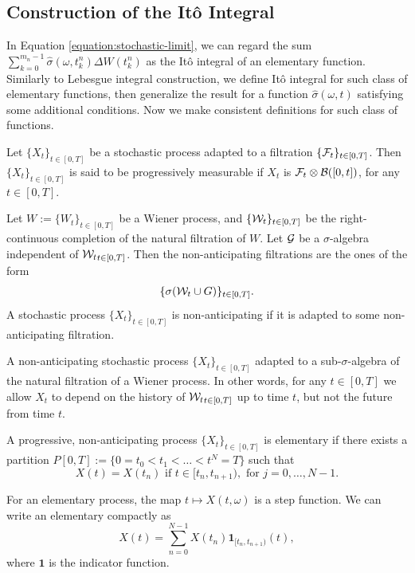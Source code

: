 \subsection{Construction of the Itô Integral}

In Equation \ref{equation:stochastic-limit}, we can regard the sum $\sum\limits_{k=0}^{m_n-1} \hat{\sigma}(\omega, t_k^n)\Delta W(t^n_{k})$ as the Itô integral of an elementary function. Similarly to Lebesgue integral construction, we define Itô integral for such class of elementary functions, then generalize the result for a function $\hat{\sigma}(\omega, t)$ satisfying some additional conditions. Now we make consistent definitions for such class of functions.

\begin{definition}
  Let $\{X_t\}_{t\in[0,T]}$ be a stochastic process adapted to a filtration $\{\mathcal{F}_t\}_{t\in[0,T]}$. Then $\{X_t\}_{t\in[0,T]}$ is said to be progressively measurable if $X_t$ is $\mathcal{F}_t\otimes\mathcal{B}([0,t])$, for any $t\in[0,T]$.
\end{definition}

\begin{definition}
  Let $W:=\{W_t\}_{t\in[0,T]}$ be a Wiener process, and $\{\mathcal{W}_t\}_{t\in[0,T]}$ be the right-continuous completion of the natural filtration of $W$. Let $\mathcal{G}$ be a $\sigma$-algebra independent of ${\mathcal{W}_t}_{t\in[0,T]}$. Then the non-anticipating filtrations are the ones of the form
  $$\{\sigma(\mathcal{W}_t \cup G)\}_{t\in[0,T]}.$$
  A stochastic process $\{X_t\}_{t\in[0,T]}$ is non-anticipating if it is adapted to some non-anticipating filtration.
\end{definition}

\begin{remark}
  A non-anticipating stochastic process $\{X_t\}_{t\in[0,T]}$ adapted to a sub-$\sigma$-algebra of the natural filtration of a Wiener process. In other words, for any $t\in[0,T]$ we allow $X_t$ to depend on the history of ${\mathcal{W}_t}_{t\in[0,T]}$ up to time $t$, but not the future from time $t$.
\end{remark}

\begin{definition}
  A progressive, non-anticipating process $\{X_t\}_{t\in[0,T]}$ is elementary if there exists a partition $P[0,T]:=\{0=t_0<t_1<\ldots<t^N=T\}$ such that
  $$X(t) = X(t_n) \text{ if } t \in [t_n, t_{n+1}), \text{ for } j=0,\ldots,N-1.$$
\end{definition}
\begin{remark}
  For an elementary process, the map $t\mapsto X(t,\omega)$ is a step function. We can write an elementary compactly as
  $$X(t) = \sum\limits_{n=0}^{N-1} X(t_n)\mathbf{1}_{[t_n, t_{n+1})}(t),$$
  where $\mathbf{1}$ is the indicator function.
\end{remark}

